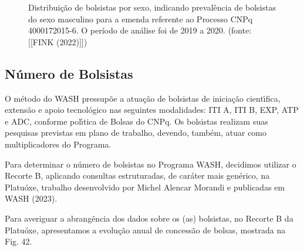 \documentclass[
12pt,		%
openright,	%
twoside,  %
a4paper,			%
chapter=TITLE,		%
english,			%
french,				%
spanish,			%
brazil				%
]{USPSC-classe/USPSC}
\begin{document}
\begin{figure}[max size={\textwidth}{\textheight}]
\begin{minipage}[b]{0.4\linewidth}
                \caption{Distribui\c{c}\~ao de bolsistas por sexo, indicando preval\^encia de bolsistas do sexo masculino para a emenda referente ao Processo CNPq 4000172015-6. O per\'{i}odo de an\'alise foi de 2019 a 2020. (fonte: [[FINK (2022)]])}
                \label{1164a3115bd14e3f25b6b141840652ffbd0d2374}
\end{minipage}
\hspace{0.5cm}
\end{figure}



\subsection[N\'umero de Bolsistas]{N\'umero de Bolsistas}\label{N\'umero de Bolsistas}
O m\'etodo do WASH pressup\~oe a atua\c{c}\~ao de bolsistas de inicia\c{c}\~ao cient\'{\i}fica, extens\~ao e apoio tecnol\'ogico nas seguintes modalidades: ITI A, ITI B, EXP, ATP e ADC, conforme pol\'{\i}tica de Bolsas do CNPq. Os bolsistas realizam suas pesquisas previstas em plano de trabalho, devendo, tamb\'em, atuar como multiplicadores do Programa.

















Para determinar o n\'umero de bolsistas no Programa WASH, decidimos utilizar o Recorte B, aplicando consultas estruturadas, de car\'ater mais gen\'erico, na Platu\'oxe, trabalho desenvolvido por Michel Alencar Morandi e publicadas em  WASH (2023).

















Para averiguar a abrang\^encia dos dados sobre os (as) bolsistas, no Recorte B da Platu\'oxe, apresentamos a evolu\c{c}\~ao anual de concess\~ao de bolsas, mostrada na Fig. 42.
\end{document}
